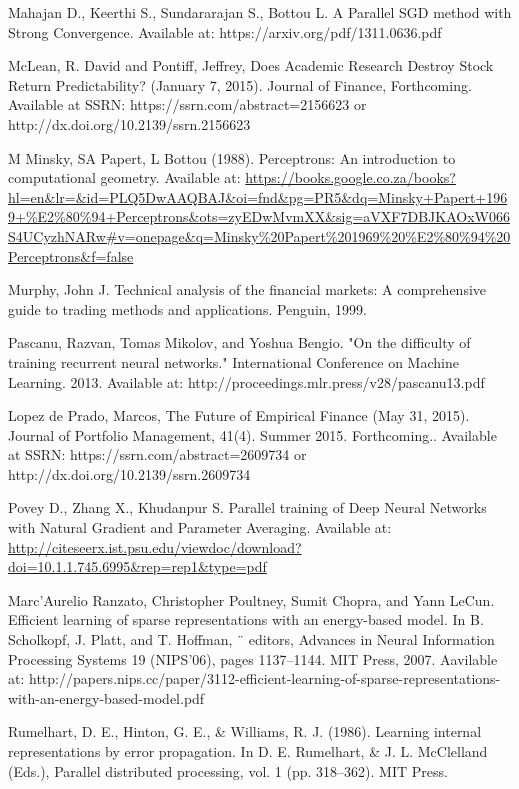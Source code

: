 \documentclass[a4paper,latin]{paper}
\begin{document}
\begin{thebibliography}{bibliography}
Mahajan D., Keerthi S., Sundararajan S., Bottou L. A Parallel SGD method with Strong 
Convergence. Available at: https://arxiv.org/pdf/1311.0636.pdf

McLean, R. David and Pontiff, Jeffrey, Does Academic Research Destroy Stock Return Predictability? (January 7, 2015). Journal of Finance, Forthcoming. Available at SSRN: https://ssrn.com/abstract=2156623 or http://dx.doi.org/10.2139/ssrn.2156623

M Minsky, SA Papert, L Bottou (1988). Perceptrons: An introduction to computational  geometry. Available at: \url{https://books.google.co.za/books?hl=en&lr=&id=PLQ5DwAAQBAJ&oi=fnd&pg=PR5&dq=Minsky+Papert+1969+%E2%80%94+Perceptrons&ots=zyEDwMvmXX&sig=aVXF7DBJKAOxW066S4UCyzhNARw#v=onepage&q=Minsky%20Papert%201969%20%E2%80%94%20Perceptrons&f=false}

Murphy, John J. Technical analysis of the financial markets: A comprehensive guide to trading methods and applications. Penguin, 1999.

Pascanu, Razvan, Tomas Mikolov, and Yoshua Bengio. "On the difficulty of training recurrent neural networks." International Conference on Machine Learning. 2013.
Available at: http://proceedings.mlr.press/v28/pascanu13.pdf

Lopez de Prado, Marcos, The Future of Empirical Finance (May 31, 2015). Journal of Portfolio Management, 41(4). Summer 2015. Forthcoming.. Available at SSRN: https://ssrn.com/abstract=2609734 or http://dx.doi.org/10.2139/ssrn.2609734

Povey D., Zhang X., Khudanpur S. Parallel training of Deep Neural Networks with Natural Gradient and Parameter Averaging. Available at: \url{http://citeseerx.ist.psu.edu/viewdoc/download?doi=10.1.1.745.6995&rep=rep1&type=pdf}

Marc’Aurelio Ranzato, Christopher Poultney, Sumit Chopra, and Yann LeCun. Efficient learning of sparse representations with an energy-based model. In B. Scholkopf, J. Platt, and T. Hoffman, ¨ editors, Advances in Neural Information Processing Systems 19 (NIPS’06), pages 1137–1144. MIT Press, 
2007. Aavilable at: http://papers.nips.cc/paper/3112-efficient-learning-of-sparse-representations-with-an-energy-based-model.pdf

Rumelhart, D. E., Hinton, G. E., \& Williams, R. J. (1986). Learning internal representations by error propagation. In D. E. Rumelhart, \& J. L. McClelland (Eds.), Parallel distributed processing, vol. 1 (pp. 318–362). MIT Press.


\end{thebibliography}
\end{document}
